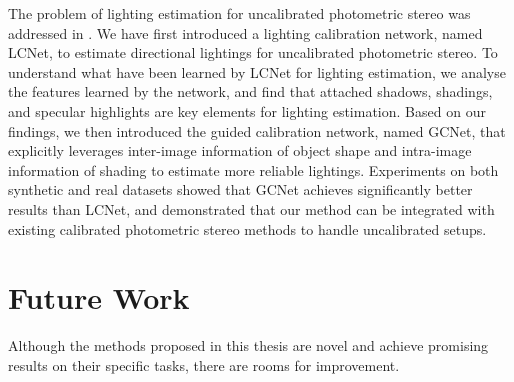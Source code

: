 The problem of lighting estimation for uncalibrated photometric stereo was addressed in .
We have first introduced a lighting calibration network, named LCNet, to estimate directional lightings for uncalibrated photometric stereo.
To understand what have been learned by LCNet for lighting estimation, we analyse the features learned by the network, and find that attached shadows, shadings, and specular highlights are key elements for lighting estimation. 
Based on our findings, we then introduced the guided calibration network, named GCNet, that explicitly leverages inter-image information of object shape and intra-image information of shading to estimate more reliable lightings.
Experiments on both synthetic and real datasets showed that GCNet achieves significantly better results than LCNet, and demonstrated that our method can be integrated with existing calibrated photometric stereo methods to handle uncalibrated setups.

\section{Future Work}
Although the methods proposed in this thesis are novel and achieve promising results on their specific tasks, there are rooms for improvement.

